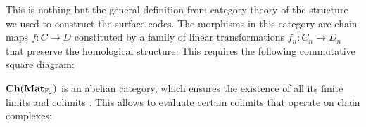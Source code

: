 \documentclass[12pt, twoside, openany]{book}
\newcommand{\catname}[1]{{\normalfont\textbf{#1}}}
\newcommand{\Ch}{\catname{Ch}}
\newcommand{\Mat}{\catname{Mat}}
\begin{document}
This is nothing but the general definition from category theory of the structure we used to construct the surface codes. The morphisms in this category are chain maps $f: C \rightarrow D$ constituted by a family of linear transformations $f_n : C_n \rightarrow D_n$ that preserve the homological structure. This requires the following commutative square diagram:
\begin{center}
\end{center}
$\Ch(\Mat_{\mathbb{F}_2})$ is an abelian category, which ensures the existence of all its finite limits and colimits \cite{cowtan2025homologyhopfalgebrasquantum}. This allows to evaluate certain colimits that operate on chain complexes:
\end{document}
